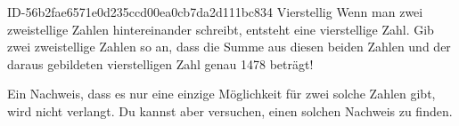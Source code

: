 \begin{exercise}
      {ID-56b2fae6571e0d235ccd00ea0cb7da2d111bc834}
      {Vierstellig}
  \ifproblem\problem
    Wenn man zwei zweistellige Zahlen hintereinander schreibt, entsteht eine
    vierstellige Zahl. Gib zwei zweistellige Zahlen so an, dass die Summe
    aus diesen beiden Zahlen und der daraus gebildeten vierstelligen Zahl
    genau \num{1478} beträgt!\par
    Ein Nachweis, dass es nur eine einzige Möglichkeit für zwei solche Zahlen
    gibt, wird nicht verlangt. Du kannst aber versuchen, einen solchen
    Nachweis zu finden.
  \fi
\end{exercise}
